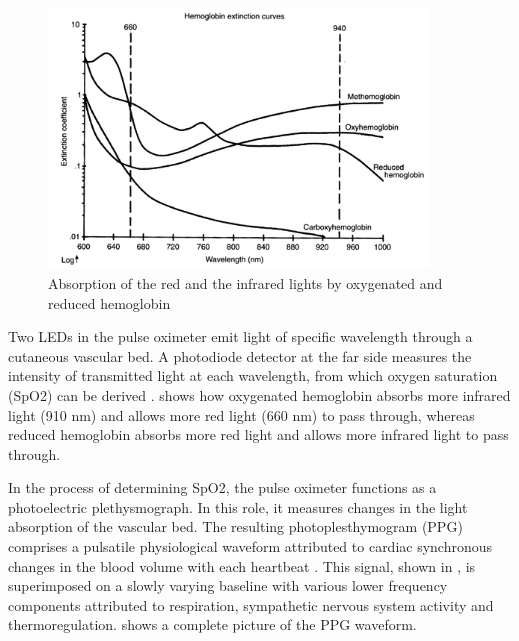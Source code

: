 \begin{figure}[!ht]
\centering
\includegraphics[width=0.9\textwidth]{images/hemoglobin.png}
\caption{Absorption of the red and the infrared lights by oxygenated and reduced hemoglobin}
\label{fig:hemoglobin}
\end{figure}



Two LEDs in the pulse oximeter emit light of specific wavelength through a cutaneous vascular bed. A photodiode detector at the far side measures the intensity of transmitted light at each wavelength, from which oxygen saturation (SpO2) can be derived \cite{bagha2011real}.  shows how oxygenated hemoglobin absorbs more infrared light (910 nm) and allows more red light (660 nm) to pass through, whereas reduced hemoglobin absorbs more red light and allows more infrared light to pass through.


In the process of determining SpO2, the pulse oximeter functions as a photoelectric plethysmograph. In this role, it measures changes in the light absorption of the vascular bed. The resulting photoplesthymogram (PPG) comprises a pulsatile physiological waveform attributed to cardiac synchronous changes in the blood volume with each heartbeat \cite{allen2007photoplethysmography}. This signal, shown in , is superimposed on a slowly varying baseline with various lower frequency components attributed to respiration, sympathetic nervous system activity and thermoregulation.  shows a complete picture of the PPG waveform.

